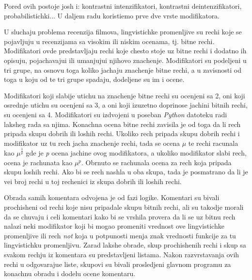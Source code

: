 \documentclass[cyr]{bibl}
\begin{document}
\begin{justify}
\begin{itemize}
\begin{justify}
    \end{justify}
	
\end{itemize} 
\newline
\newline
Pored ovih postoje josh i: kontrastni intenzifikatori, kontrastni deintenzifikatori, probabilistichki... U daljem radu koristi\cc emo prve dve vrste modifikatora.

U sluchaju problema recenzija filmova, lingvistichke promenljive su rechi koje se pojavljuju u recenzijama sa visokim ili niskim ocenama, tj. bitne rechi. Modifikatori ovde predstavljaju rechi koje chesto stoje uz bitne rechi i dodatno ih opisuju, pojachavaju\cc i ili umanjuju\cc i njihovo znachenje. Modifikatori su podeljeni u tri grupe, na osnovu toga koliko jachaju znachenje bitne rechi, a u zavisnosti od toga u koju od te tri grupe spadaju, dodeljene su im i ocene.

Modifikatori koji slabije utichu na znachenje bitne rechi su ocenjeni sa 2, oni koji osrednje utichu su ocenjeni sa 3, a oni koji izuzetno doprinose jachini bitnih rechi, su ocenjeni sa 4.
Modifikatori su izdvojeni u poseban \textit{\Lat Python} datoteku radi laksheg rada sa njima. Konachna ocena bitne rechi zavisila je od toga da li rech pripada skupu dobrih ili loshih rechi. Ukoliko rech pripada skupu dobrih rechi i modifikator uz tu rech jacha znachenje rechi, tada se ocena \(\mu\) te rechi racunala kao \(\mu^{\frac{1}{p}}\) gde je \textit{\Lat p} ocena jachine ovog modifikatora, a ukoliko modifikator slabi rech, ocena je rachunata kao \(\mu^{p}\). Obrnuto se rachunala ocena za rech koja pripada skupu loshih rechi. Ako bi se rech nashla u oba skupa, tada je posmatrano da li je ve\cc i broj rechi u toj rechenici iz skupa dobrih ili loshih rechi.

Obrada samih komentara odvojena je od fazi logike. Komentari su bivali prochish\cc eni od rechi koje nisu pripadale skupu bitnih rechi, ali su takodje morali da se chuvaju i celi komentari kako bi se vrshila provera da li se uz bitnu rech nalazi neki modifikator koji bi mogao promeniti vrednost ove lingvistichke promenljive ili rech \textit{\Lat not} koja u potpunosti menja znak vrednosti funkcije za tu lingvistichku promenljivu.
Zarad lakshe obrade, skup prochish\cc enih rechi i skup sa svakom rechju iz komentara su predstavljeni listama. Nakon razvrstavanja ovih rechi u odgovaraju\cc e liste, skupovi su bivali prosledjeni glavnom programu za konachnu obradu i dodelu ocene komentaru.
\end{justify}
\end{document}
